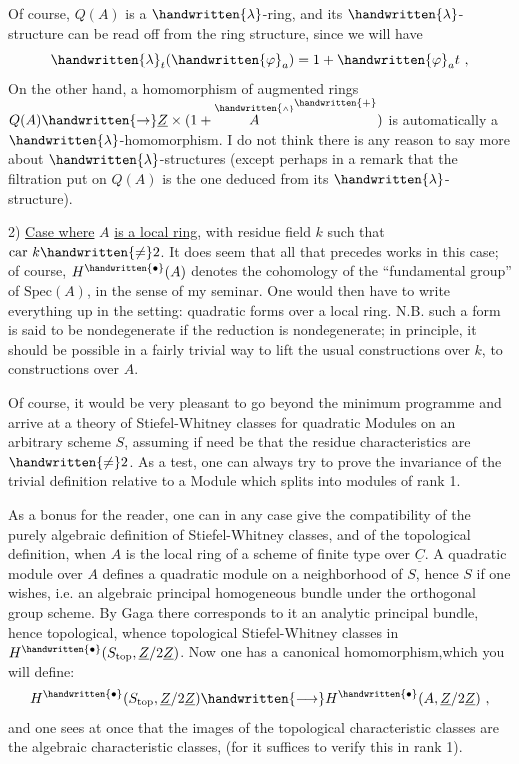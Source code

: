 Of course, $Q(A)$ is a $\handwritten{\lambda}$-ring, and its $\handwritten{\lambda}$-structure can be read off from the ring structure, since we will have
\[
\handwritten{\lambda}_t(\handwritten{\varphi}_a)=1+\handwritten{\varphi}_a t\ ,
\]
On the other hand, a homomorphism of augmented rings $Q(A)\handwritten{\to}\underline{Z}\times(1+\overset{\handwritten{\scriptscriptstyle\wedge}}{A}^{\handwritten{+}})$ is automatically a $\handwritten{\lambda}$-homomorphism. I do not think there is any reason to say more about $\handwritten{\lambda}$-structures (except perhaps in a remark that the filtration put on $Q(A)$ is the one deduced from its $\handwritten{\lambda}$-structure).

2) \uline{Case where} $A$ \uline{is a local ring}, with residue field $k$ such that $\mathrm{car}\ k\handwritten{\ne}2$. It does seem that all that precedes works in this case; of course, $H^{\handwritten{\bullet}}(A)$ denotes the cohomology of the ``fundamental group'' of $\mathrm{Spec}(A)$, in the sense of my seminar. One would then have to write everything up in the setting: quadratic forms over a local ring. N.B. such a form is said to be nondegenerate if the reduction is nondegenerate; in principle, it  should be possible in a fairly trivial way to lift the usual constructions over $k$, to constructions over $A$.

Of course, it would be very pleasant to go beyond the minimum programme and arrive at a theory of Stiefel-Whitney classes for quadratic Modules on an arbitrary scheme $S$,  assuming if need be that the residue characteristics are $\handwritten{\ne}2$.  As a test, one can always try to prove the invariance of the trivial definition relative to a  Module which splits into  modules of rank 1.

As a bonus for the reader, one can in any case give the compatibility of the purely algebraic definition of Stiefel-Whitney classes, and of the topological definition, when $A$ is the local ring of a scheme of finite type over $\underline{C}$. A quadratic module over $A$ defines a quadratic module on a neighborhood of $S$, hence $S$ if one wishes, i.e. an algebraic principal homogeneous bundle under the orthogonal group scheme. By Gaga there corresponds to it an analytic principal bundle, hence topological, whence topological Stiefel-Whitney classes in $H^{\handwritten{\bullet}}(S_{\mathrm{top}},\underline{Z}/2\underline{Z})$. Now one has a canonical homomorphism,which you will define:
\[
H^{\handwritten{\bullet}}(S_{\mathrm{top}},\underline{Z}/2\underline{Z})\handwritten{\longrightarrow}H^{\handwritten{\bullet}}(A,\underline{Z}/2\underline{Z})\ ,
\]
and one sees at once that the images of the topological characteristic classes are the algebraic characteristic classes, (for it suffices to verify this in rank 1).
